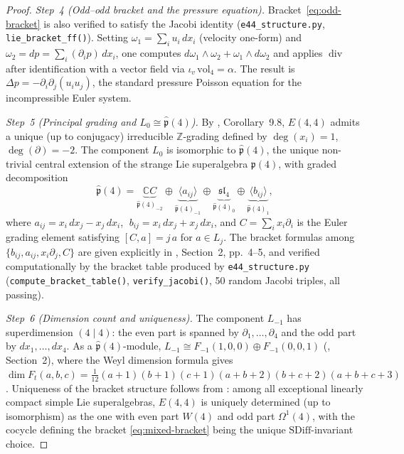 \documentclass[reqno,10pt]{amsart}
\theoremstyle{definition}
\def\divX{{\operatorname{div}}}
\def\phat{\hat{\mathfrak{p}}}
\def\slN{{\mathfrak{sl}}_4}
\begin{document}
\begin{proof}
\smallskip
\noindent\textit{Step~4 (Odd--odd bracket and the pressure equation).}
Bracket~\eqref{eq:odd-bracket} is also verified to satisfy the Jacobi
identity (\texttt{e44\_structure.py}, \texttt{lie\_bracket\_ff()}).  Setting
$\omega_1 = \sum_i u_i\,dx_i$ (velocity one-form) and
$\omega_2 = dp = \sum_i(\partial_i p)\,dx_i$, one computes
$d\omega_1\wedge\omega_2 + \omega_1\wedge d\omega_2$ and applies
$\divX$ after identification with a vector field via
$\iota_v\,\mathrm{vol}_4 = \alpha$.  The result is
$\Delta p = -\partial_i\partial_j(u_i u_j)$, the standard pressure Poisson
equation for the incompressible Euler system.

\smallskip
\noindent\textit{Step~5 (Principal grading and $L_0\cong\phat(4)$).}
By \cite{CCK2026}, Corollary~9.8, $E(4,4)$ admits a unique (up to conjugacy)
irreducible $\mathbb{Z}$-grading defined by $\deg(x_i) = 1$, $\deg(\partial) = -2$.
The component $L_0$ is isomorphic to $\phat(4)$, the unique non-trivial
central extension of the strange Lie superalgebra $\mathfrak{p}(4)$, with
graded decomposition
\[
  \phat(4)
  = \underbrace{\mathbb{C}C}_{\phat(4)_{-2}}
    \oplus\underbrace{\langle a_{ij}\rangle}_{\phat(4)_{-1}}
    \oplus\underbrace{\slN}_{\phat(4)_0}
    \oplus\underbrace{\langle b_{ij}\rangle}_{\phat(4)_1},
\]
where $a_{ij} = x_i\,dx_j - x_j\,dx_i$, $\;b_{ij} = x_i\,dx_j + x_j\,dx_i$,
and $C = \sum_i x_i\partial_i$ is the Euler grading element satisfying
$[C,a] = j\,a$ for $a\in L_j$.  The bracket formulas among
$\{b_{ij},a_{ij},x_i\partial_j,C\}$ are given explicitly in \cite{CCK2026},
Section~2, pp.~4--5, and verified computationally by the bracket table
produced by \texttt{e44\_structure.py} (\texttt{compute\_bracket\_table()},
\texttt{verify\_jacobi()}, 50 random Jacobi triples, all passing).

\smallskip
\noindent\textit{Step~6 (Dimension count and uniqueness).}
The component $L_{-1}$ has superdimension $(4\mid 4)$: the even part is
spanned by $\partial_1,\ldots,\partial_4$ and the odd part by
$dx_1,\ldots,dx_4$.  As a $\phat(4)$-module,
$L_{-1}\cong F_{-1}(1,0,0)\oplus F_{-1}(0,0,1)$
(\cite{CCK2026}, Section~2), where the Weyl dimension formula gives
$\dim F_t(a,b,c) = \tfrac{1}{12}(a{+}1)(b{+}1)(c{+}1)(a{+}b{+}2)(b{+}c{+}2)(a{+}b{+}c{+}3)$.
Uniqueness of the bracket structure follows from \cite{Kac1998}: among all
exceptional linearly compact simple Lie superalgebras, $E(4,4)$ is uniquely
determined (up to isomorphism) as the one with even part $W(4)$ and odd
part $\Omega^1(4)$, with the cocycle defining the bracket
\eqref{eq:mixed-bracket} being the unique $\mathrm{SDiff}$-invariant
choice.
\end{proof}
\end{document}
